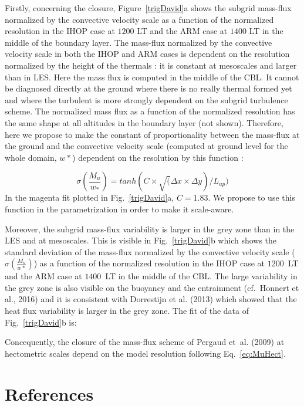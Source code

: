 Firstly, concerning the closure, Figure~\ref{trigDavid}a shows the subgrid mass-flux normalized by the convective velocity scale as a function of the normalized resolution in the IHOP case at $1200$ LT and the ARM case at $1400$ LT in the middle of the boundary layer. The mass-flux normalized by the convective velocity scale in both the IHOP and ARM cases is dependent on the resolution normalized by the height of the thermals : it is constant at mesoscales and larger than in LES. Here the mass flux is computed in the middle of the CBL. It cannot be diagnosed directly at the ground where there is no really thermal formed yet and where the turbulent is more strongly dependent on the subgrid turbulence scheme. The normalized mass flux as a function of the normalized resolution has the same shape at all altitudes in the boundary layer (not shown). Therefore, here we propose to make the constant of proportionality between the mass-flux at the ground and the convective velocity scale (computed at ground level for the whole domain, $w*$) dependent on the resolution by this function :

\begin{equation}
	\sigma(\frac{M_u}{w_*})=tanh(C\times\sqrt(\Delta x \times \Delta y)/L_{up})
\label{eq:MuHect}
\end{equation}
In the magenta fit plotted in Fig.~\ref{trigDavid}a, $C=1.83$. We propose to use this function in the parametrization in order to make it scale-aware.

Moreover, the subgrid mass-flux variability is larger in the grey zone than in the LES and at mesoscales. This is visible in Fig.~\ref{trigDavid}b which shows the standard deviation of the mass-flux normalized by the convective velocity scale ($\sigma(\frac{M_u}{w*})$) as a function of the normalized resolution in the IHOP case at $1200$~LT and the ARM case at $1400$~LT in the middle of the CBL. The large variability in the grey zone is also visible on the buoyancy and the entrainment (cf.~Honnert et al., 2016) and it is consistent with Dorrestijn et al. (2013) which showed that the heat flux variability is larger in the grey zone. The fit of the data of Fig.~\ref{trigDavid}b is:

Concequently, the closure of the mass-flux scheme of Pergaud et~al. (2009) at hectometric scales depend on the model resolution following Eq.~\ref{eq:MuHect}.

\section{References}


